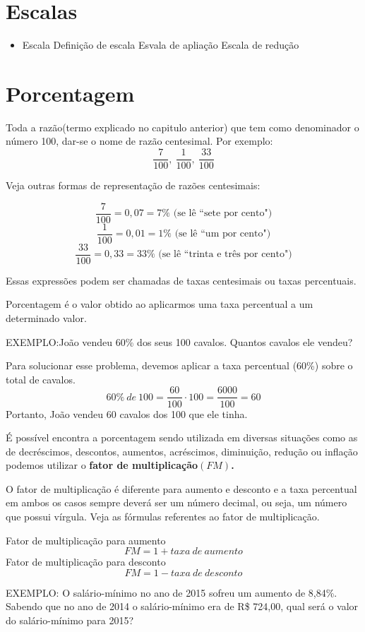 \section{Escalas}

	\begin{itemize}
		\item Escala
		\subitem Definição de escala 
		\subitem Esvala de apliação
		\subitem Escala de redução
	\end{itemize}

\section{Porcentagem}
Toda a razão(termo explicado no capitulo anterior) que tem
como denominador o número 100, dar-se o nome de razão centesimal. Por exemplo:
$$\frac{7}{100},~\frac{1}{100},~\frac{33}{100}$$

Veja outras formas de representação de razões centesimais:

$$\frac{7}{100}=0,07=7\% \textrm{ (se lê ``sete por cento")}$$
$$\frac{1}{100}=0,01=1\%\textrm{ (se lê ``um por cento")} $$
$$\frac{33}{100}=0,33=33\%\textrm{ (se lê ``trinta e três por cento")}$$

Essas expressões podem ser chamadas de taxas centesimais ou taxas percentuais. 
\begin{definition}
Porcentagem é o valor obtido ao aplicarmos uma taxa percentual a um determinado valor.

\end{definition}
EXEMPLO:João vendeu 60\% dos seus 100 cavalos. Quantos cavalos ele vendeu?
\begin{center}
    Para solucionar esse problema, devemos aplicar a taxa percentual (60\%) sobre o total de cavalos.
    $$60\%~de~100=\frac{60}{100}\cdot100=\frac{6000}{100}=60$$
    Portanto, João vendeu 60 cavalos dos 100 que ele tinha.
\end{center}
É possível encontra a porcentagem sendo utilizada em diversas situações como as de decréscimos, descontos, aumentos, acréscimos, diminuição, redução ou inflação podemos utilizar o \textbf{fator de multiplicação$(FM)$.}

\begin{definition}
O fator de multiplicação é diferente para aumento e desconto e a taxa percentual em ambos os casos sempre deverá ser um número decimal, ou seja, um número que possui vírgula. Veja as fórmulas referentes ao fator de multiplicação.

\end{definition}
\begin{center}
    Fator de multiplicação para aumento
    $$FM=1+taxa~de~aumento$$
    Fator de multiplicação para desconto
    $$FM=1-taxa~de~desconto$$
\end{center}
EXEMPLO: O salário-mínimo no ano de 2015 sofreu um aumento de 8,84\%. Sabendo que no ano de 2014 o salário-mínimo era de R\$ 724,00, qual será o valor do salário-mínimo para 2015?

